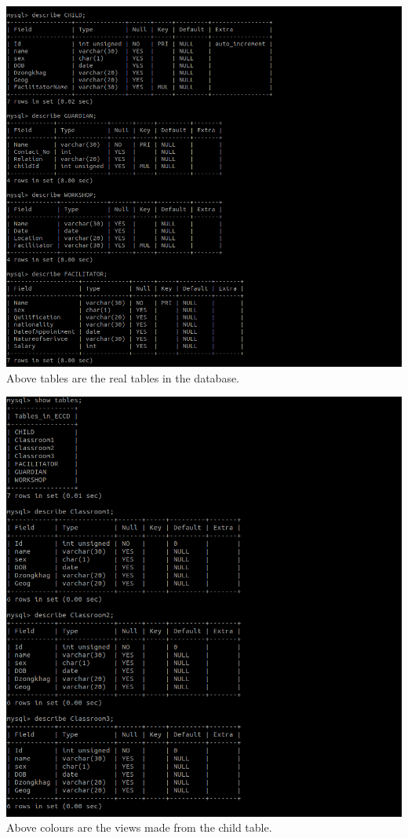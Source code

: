 \documentclass{scrreprt}
\begin{document}
	\includegraphics[width = \linewidth]{phy}
	Above tables are the real tables in the database.
		
	\includegraphics[width = \linewidth]{tab}
	Above colours are the views made from the child table.
\end{document}
